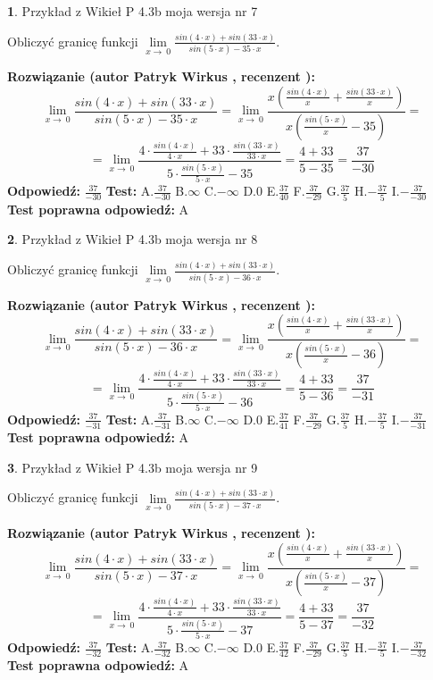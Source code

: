 \documentclass[12pt, a4paper]{article}
\theoremstyle{definition} %
\newtheorem{zad}{}
\newcommand{\zadStart}[1]{\begin{zad}#1\newline}
\newcommand{\zadStop}{\end{zad}}
\newcommand{\rozwStart}[2]{\noindent \textbf{Rozwiązanie (autor #1 , recenzent #2): }\newline}
\newcommand{\rozwStop}{\newline}
\newcommand{\odpStart}{\noindent \textbf{Odpowiedź:}\newline}
\newcommand{\odpStop}{\newline}
\newcommand{\testStart}{\noindent \textbf{Test:}\newline}
\newcommand{\testStop}{\newline}
\newcommand{\kluczStart}{\noindent \textbf{Test poprawna odpowiedź:}\newline}
\newcommand{\kluczStop}{\newline}
\begin{document}
\zadStart{Przykład z Wikieł P 4.3b moja wersja nr 7}


Obliczyć granicę funkcji $\lim\limits_{x\to\ 0}\frac{sin(4 \cdot x)+sin(33 \cdot x)}{sin(5 \cdot x)-35 \cdot x}$.
\zadStop
\rozwStart{Patryk Wirkus}{}
$$\lim\limits_{x\to\ 0}\frac{sin(4 \cdot x)+sin(33 \cdot x)}{sin(5 \cdot x)-35 \cdot x}=\lim\limits_{x\to\ 0}\frac{x(\frac{sin(4 \cdot x)}{x}+\frac{sin(33 \cdot x)}{x})}{x(\frac{sin(5 \cdot x)}{x}-35)}=$$
$$=\lim\limits_{x\to\ 0}\frac{4 \cdot \frac{sin(4 \cdot x)}{4 \cdot x}+33 \cdot \frac{sin(33 \cdot x)}{33 \cdot x}}{5 \cdot \frac{sin(5 \cdot x)}{5 \cdot x}-35}=\frac{4+33}{5-35} = \frac{37}{-30}$$
\rozwStop
\odpStart
$\frac{37}{-30}$
\odpStop
\testStart
A.$\frac{37}{-30}$
B.$\infty$
C.$-\infty$
D.$0$
E.$\frac{37}{40}$
F.$\frac{37}{-29}$
G.$\frac{37}{5}$
H.$-\frac{37}{5}$
I.$-\frac{37}{-30}$
\testStop
\kluczStart
A
\kluczStop



\zadStart{Przykład z Wikieł P 4.3b moja wersja nr 8}


Obliczyć granicę funkcji $\lim\limits_{x\to\ 0}\frac{sin(4 \cdot x)+sin(33 \cdot x)}{sin(5 \cdot x)-36 \cdot x}$.
\zadStop
\rozwStart{Patryk Wirkus}{}
$$\lim\limits_{x\to\ 0}\frac{sin(4 \cdot x)+sin(33 \cdot x)}{sin(5 \cdot x)-36 \cdot x}=\lim\limits_{x\to\ 0}\frac{x(\frac{sin(4 \cdot x)}{x}+\frac{sin(33 \cdot x)}{x})}{x(\frac{sin(5 \cdot x)}{x}-36)}=$$
$$=\lim\limits_{x\to\ 0}\frac{4 \cdot \frac{sin(4 \cdot x)}{4 \cdot x}+33 \cdot \frac{sin(33 \cdot x)}{33 \cdot x}}{5 \cdot \frac{sin(5 \cdot x)}{5 \cdot x}-36}=\frac{4+33}{5-36} = \frac{37}{-31}$$
\rozwStop
\odpStart
$\frac{37}{-31}$
\odpStop
\testStart
A.$\frac{37}{-31}$
B.$\infty$
C.$-\infty$
D.$0$
E.$\frac{37}{41}$
F.$\frac{37}{-29}$
G.$\frac{37}{5}$
H.$-\frac{37}{5}$
I.$-\frac{37}{-31}$
\testStop
\kluczStart
A
\kluczStop



\zadStart{Przykład z Wikieł P 4.3b moja wersja nr 9}


Obliczyć granicę funkcji $\lim\limits_{x\to\ 0}\frac{sin(4 \cdot x)+sin(33 \cdot x)}{sin(5 \cdot x)-37 \cdot x}$.
\zadStop
\rozwStart{Patryk Wirkus}{}
$$\lim\limits_{x\to\ 0}\frac{sin(4 \cdot x)+sin(33 \cdot x)}{sin(5 \cdot x)-37 \cdot x}=\lim\limits_{x\to\ 0}\frac{x(\frac{sin(4 \cdot x)}{x}+\frac{sin(33 \cdot x)}{x})}{x(\frac{sin(5 \cdot x)}{x}-37)}=$$
$$=\lim\limits_{x\to\ 0}\frac{4 \cdot \frac{sin(4 \cdot x)}{4 \cdot x}+33 \cdot \frac{sin(33 \cdot x)}{33 \cdot x}}{5 \cdot \frac{sin(5 \cdot x)}{5 \cdot x}-37}=\frac{4+33}{5-37} = \frac{37}{-32}$$
\rozwStop
\odpStart
$\frac{37}{-32}$
\odpStop
\testStart
A.$\frac{37}{-32}$
B.$\infty$
C.$-\infty$
D.$0$
E.$\frac{37}{42}$
F.$\frac{37}{-29}$
G.$\frac{37}{5}$
H.$-\frac{37}{5}$
I.$-\frac{37}{-32}$
\testStop
\kluczStart
A
\kluczStop
\end{document}
